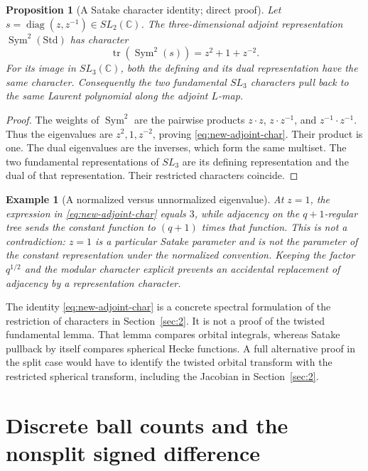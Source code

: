 \documentclass[12pt,letterpaper]{amsart}
\numberwithin{equation}{section}
\newtheorem{proposition}[theorem]{Proposition}
\newtheorem{example}[theorem]{Example}
\theoremstyle{definition}
\theoremstyle{plain}
\begin{document}
\begin{proposition}[A Satake character identity; direct proof]
\label{prop:new-adjoint-satake}
Let $s=\operatorname{diag}(z,z^{-1})\in SL_2(\mathbb C)$.
The three-dimensional adjoint representation
$\operatorname{Sym}^2(\mathrm{Std})$ has character
\begin{equation}\label{eq:new-adjoint-char}
 \operatorname{tr}(\operatorname{Sym}^2(s))=z^2+1+z^{-2}.
\end{equation}
For its image in $SL_3(\mathbb C)$, both the defining and
its dual representation have the same character.
Consequently the two fundamental $SL_3$ characters pull back
to the same Laurent polynomial along the adjoint $L$-map.
\end{proposition}
\begin{proof}
The weights of $\operatorname{Sym}^2$ are the pairwise products
$z\cdot z$, $z\cdot z^{-1}$, and $z^{-1}\cdot z^{-1}$.
Thus the eigenvalues are $z^2,1,z^{-2}$, proving
\eqref{eq:new-adjoint-char}. Their product is one. The dual
eigenvalues are the inverses, which form the same multiset.
The two fundamental representations of $SL_3$ are its defining
representation and the dual of that representation. Their
restricted characters coincide.
\end{proof}

\begin{example}[A normalized versus unnormalized eigenvalue]
At $z=1$, the expression in \eqref{eq:new-adjoint-char} equals
$3$, while adjacency on the $q+1$-regular tree sends the constant
function to $(q+1)$ times that function. This is not a contradiction:
$z=1$ is a particular Satake parameter and is not the parameter
of the constant representation under the normalized convention.
Keeping the factor $q^{1/2}$ and the modular character explicit
prevents an accidental replacement of adjacency by a representation
character.
\end{example}

The identity \eqref{eq:new-adjoint-char} is a concrete
spectral formulation of the restriction of characters in
Section~\ref{sec:2}. It is not a proof of the twisted
fundamental lemma. That lemma compares orbital integrals, whereas
Satake pullback by itself compares spherical Hecke functions.
A full alternative proof in the split case would have to identify
the twisted orbital transform with the restricted spherical
transform, including the Jacobian in Section~\ref{sec:2}.

\section{Discrete ball counts and the nonsplit signed difference}
\label{sec:new-counts}
\end{document}
